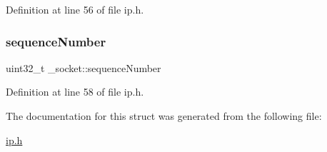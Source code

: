 Definition at line 56 of file ip.\+h.

\mbox{\label{struct__socket_a2f8ccd3dae23cc49d1a81bbcbba14ef5}} 
\subsubsection{\texorpdfstring{sequence\+Number}{sequenceNumber}}
{\footnotesize\ttfamily uint32\+\_\+t \+\_\+socket\+::sequence\+Number}



Definition at line 58 of file ip.\+h.



The documentation for this struct was generated from the following file\+:\begin{DoxyCompactItemize}
\item 
\hyperlink{ip_8h}{ip.\+h}\end{DoxyCompactItemize}
